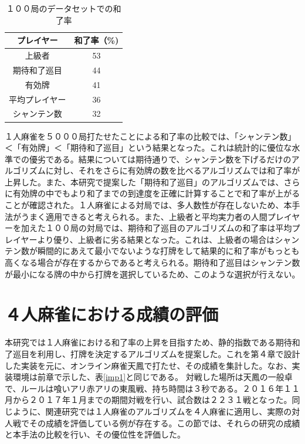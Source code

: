 \begin{table}[h]
  \caption{１００局のデータセットでの和了率}
  \label{100houra}
  \begin{center}
  \begin{tabular}{c|c}
    \hline
    プレイヤー   & 和了率（\%)\\\hline\hline
    上級者 	& 53 \\\hline
    期待和了巡目 & 44 \\\hline
    有効牌 	& 41 \\\hline
    平均プレイヤー 	& 36\\\hline
    シャンテン数	& 32 \\\hline
  \end{tabular}\end{center}
\end{table}

１人麻雀を５０００局打たせたことによる和了率の比較では、「シャンテン数」＜「有効牌」＜「期待和了巡目」という結果となった。これは統計的に優位な水準での優劣である。結果については期待通りで、シャンテン数を下げるだけのアルゴリズムに対し、それをさらに有効牌の数を比べるアルゴリズムでは和了率が上昇した。また、本研究で提案した「期待和了巡目」のアルゴリズムでは、さらに有効牌の中でもより和了までの到達度を正確に計算することで和了率が上がることが確認された。１人麻雀による対局では、多人数性が存在しないため、本手法がうまく適用できると考えられる。また、上級者と平均実力者の人間プレイヤーを加えた１００局の対局では、期待和了巡目のアルゴリズムの和了率は平均プレイヤーより優り、上級者に劣る結果となった。これは、上級者の場合はシャンテン数が瞬間的にあえて最小でないような打牌をして結果的に和了率がもっとも高くなる場合が存在するからであると考えられる。期待和了巡目はシャンテン数が最小になる牌の中から打牌を選択しているため、このような選択が行えない。


\section{４人麻雀における成績の評価} %
本研究では１人麻雀における和了率の上昇を目指すため、静的指数である期待和了巡目を利用し、打牌を決定するアルゴリズムを提案した。これを第４章で設計した実装を元に、オンライン麻雀天鳳で打たせ、その成績を集計した。なお、実装環境は前章で示した、表\ref{imp1}と同じである。
対戦した場所は天鳳の一般卓で、ルールは喰いアリ赤アリの東風戦、持ち時間は３秒である。２０１６年１１月から２０１７年１月までの期間対戦を行い、試合数は２２３１戦となった。同じように、関連研究では１人麻雀のアルゴリズムを４人麻雀に適用し、実際の対人戦でその成績を評価している例が存在する。この節では、それらの研究の成績と本手法の比較を行い、その優位性を評価した。

